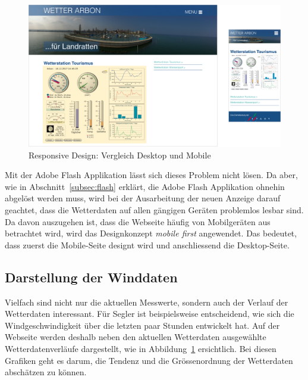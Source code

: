 \begin{figure}[h!]
	\centering
	\includegraphics[width=1\linewidth]{img/responsive}
	\caption{Responsive Design: Vergleich Desktop und Mobile}
	\label{img:responsive}
\end{figure}


\noindent
Mit der Adobe Flash Applikation lässt sich dieses Problem nicht lösen. Da aber, wie in Abschnitt~\ref{subsec:flash} erklärt, die Adobe Flash Applikation ohnehin abgelöst werden muss, wird bei der Ausarbeitung der neuen Anzeige darauf geachtet, dass die Wetterdaten auf allen gängigen Geräten problemlos lesbar sind. Da davon auszugehen ist, dass die Webseite häufig von Mobilgeräten aus betrachtet wird, wird das Designkonzept \textit{mobile first} angewendet. Das bedeutet, dass zuerst die Mobile-Seite designt wird und anschliessend die Desktop-Seite.


\subsection{Darstellung der Winddaten}
Vielfach sind nicht nur die aktuellen Messwerte, sondern auch der Verlauf der Wetterdaten interessant. Für Segler ist beispielsweise entscheidend, wie sich die Windgeschwindigkeit über die letzten paar Stunden entwickelt hat. Auf der Webseite werden deshalb neben den aktuellen Wetterdaten ausgewählte Wetterdatenverläufe dargestellt, wie in Abbildung~\ref{img:responsive} ersichtlich. Bei diesen Grafiken geht es darum, die Tendenz und die Grössenordnung der Wetterdaten abschätzen zu können.
\newline

